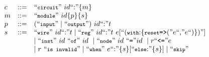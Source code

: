 \begin{figure}[htbp]
\vspace{-2mm}
{ %
\[
\begin{array}{l l l}
c & ::= & \mbox{``\fnprettyll{circuit}''}\ id \mbox{``:''} \{m\}\\
%
m & ::= & \mbox{``\fnprettyll{module}''} \ id \{p\} \{s\}\\
%
%
p & ::= & (\mbox{``\fnprettyll{input}''} \mid \mbox{``\fnprettyll{output}''})\ id\mbox{``:''}t \\
%
 s & ::= & \mbox{``\fnprettyll{wire}''}\ id \mbox{``:''}t  \mid \mbox{``\fnprettyll{reg}''}\ id \mbox{``:''}t\ e [\mbox{``(\fnprettyll{with}:\{\fnprettyll{reset}{\tt =>}(''} e\mbox{``,''} e \mbox{``)\})''}] \\
  &   &  \mid
  \mbox{``\fnprettyll{inst}''}\ id\ \mbox{``\fnprettyll{of}''}\ id\ \mid \mbox{``\fnprettyll{node}''}\ id\ \mbox{``{\tt =}''} id\  \mid r \mbox{``{\tt <=}''} e  \\
  &  & \mid r\ \mbox{``\fnprettyll{is invalid}''}  \mid \mbox{``\fnprettyll{when}''}\ e\mbox{``:''}\{s\} [\mbox{``\fnprettyll{else}:''} \{s\}] \mid \mbox{``\fnprettyll{skip}''}\\
%
%

\end{array}\]}
\end{figure}
